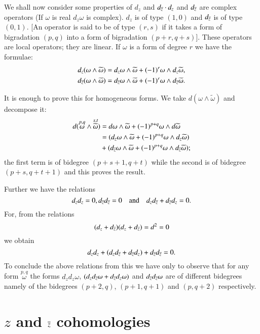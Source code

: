 We shall now consider some properties of $d_{z}$ and $d_{\overline{z}}\cdot
d_{z}$ and $d_{\overline{z}}$ are complex operators (If $\omega$ is real
$d_{z}\omega$ is complex). $d_{z}$ is of type $(1,0)$ and $d_{\overline{z}}$
is of type $(0,1)$. [An operator is said to be of type $(r,s)$ if it
  takes a form of bigradation $(p,q)$ into a form of bigradation
  $(p+r,q+s)$]. These operators are local operators; they are
linear. If $\omega$ is a form of degree $r$ we have the formulae:
\begin{align*}
d_{z}(\omega\wedge \widetilde{\omega}) &=
d_{z}\omega\wedge\widetilde{\omega}+(-1)^{r}\omega\wedge
d_{z}\widetilde{\omega},\\
d_{\overline{z}}(\omega\wedge\widetilde{\omega}) &=
d_{\overline{z}}\omega\wedge\widetilde{\omega} +(-1)^{r}\omega\wedge
d_{\overline{z}}\widetilde{\omega}. 
\end{align*}\pageoriginale

It is enough to prove this for homogeneous forms. We take
$d(\omega\wedge\widetilde{\omega})$ and decompose it:
\begin{align*}
d(\overset{p,q}{\omega}\wedge \overset{s,t}{\widetilde{\omega}}) &=
d\omega\wedge\widetilde{\omega}+(-1)^{p+q}\omega \wedge
d\widetilde{\omega}\\
&= (d_{z}\omega\wedge\widetilde{\omega}+(-1)^{p+q}\omega\wedge
d_{z}\widetilde{\omega})\\
&+(d_{\overline{z}}\omega\wedge\widetilde{\omega}+(-1)^{p+q}\omega\wedge
d_{\overline{z}}\widetilde{\omega}); 
\end{align*}
the first term is of bidegree $(p+s+1,q+t)$ while the second is of
bidegree $(p+s,q+t+1)$ and this proves the result.

Further we have the relations
$$
d_{z}d_{z}=0, d_{\overline{z}}d_{\overline{z}}=0\quad\text{and}\quad
d_{z}d_{\overline{z}}+d_{\overline{z}}d_{z}=0.
$$
For, from the relations
$$
(d_{z}+d_{\overline{z}})(d_{z}+d_{\overline{z}})=d^{2}=0
$$
we obtain 
$$
d_{z}d_{z}+(d_{z}d_{\overline{z}}+d_{\overline{z}}d_{z})+d_{\overline{z}}d_{\overline{z}}=0.
$$
To conclude the above relations from this we have only to observe that
for any form $\overset{p,q}{\omega}$ the forms $d_{z}d_{z}\omega$,
$(d_{z}d_{\overline{z}}\omega+d_{\overline{z}}d_{z}\omega)$ and
$d_{\overline{z}}d_{\overline{z}} \omega $ are of different bidegrees namely of the
bidegrees $(p+2,q)$, $(p+1,q+1)$ and $(p,q+2)$ respectively.

\section*{$z$ and $\overline{z}$ cohomologies}\pageoriginale


